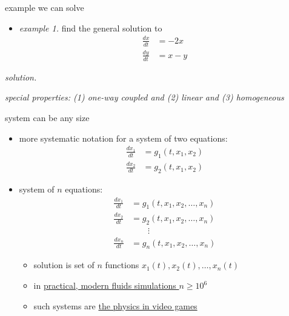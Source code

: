 \documentclass[urlcolor=blue,dvipsnames]{beamer}
\begin{document}
\begin{frame}{example we can solve}

\begin{itemize}
\item \emph{example 1.}  find the general solution to
\begin{align*}
\frac{dx}{dt} &= - 2 x\\
\frac{dy}{dt} &= x - y
\end{align*}
\end{itemize}

\noindent \emph{solution.}

\vspace{45mm}
\hfill \tiny \emph{special properties: (1) one-way coupled and (2) linear and (3) homogeneous}
\end{frame}


\begin{frame}{system can be any size}

\begin{itemize}
\item more systematic notation for a system of two equations:
\footnotesize
\begin{align*}
\frac{dx_1}{dt} &= g_1(t,x_1,x_2) \\
\frac{dx_2}{dt} &= g_2(t,x_1,x_2)
\end{align*}
\normalsize
\item system of $n$ equations:
\alert{
\begin{align*}
\frac{dx_1}{dt} &= g_1(t,x_1,x_2,\dots,x_n) \\
\frac{dx_2}{dt} &= g_2(t,x_1,x_2,\dots,x_n) \\
                &\qquad \vdots \\
\frac{dx_n}{dt} &= g_n(t,x_1,x_2,\dots,x_n)
\end{align*}
}
    \vspace{-2mm}
    \begin{itemize}
    \item solution is set of $n$ functions $x_1(t),x_2(t),\dots,x_n(t)$
    \item in \href{http://fluidityproject.github.io/}{practical, modern fluids simulations $n\ge 10^6$}
    \item such systems are \href{https://pybullet.org/wordpress/}{the physics in video games}
    \end{itemize}
\end{itemize}
\end{frame}
\end{document}
